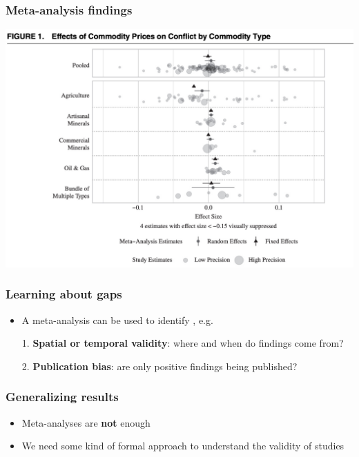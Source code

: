 \documentclass[aspectratio=43]{beamer}
\begin{document}
\begin{frame}
\frametitle{Meta-analysis findings}
\centering

\includegraphics[width = \textwidth]{../img/blair_apsr3}

\end{frame}

\begin{frame}
\frametitle{Learning about gaps}
\centering

\begin{itemize}
  \item A meta-analysis can be used to identify , e.g.
  \item[1.] \textbf{Spatial or temporal validity}: where and when do findings come from?
  \item[2.] \textbf{Publication bias}: are only positive findings being published?
\end{itemize}

\end{frame}


\begin{frame}
\frametitle{Generalizing results}
\centering

\begin{itemize}
  \item Meta-analyses are \textbf{not} enough
  \item We need some kind of formal approach to understand the validity of studies
\end{itemize}

\end{frame}
\end{document}
